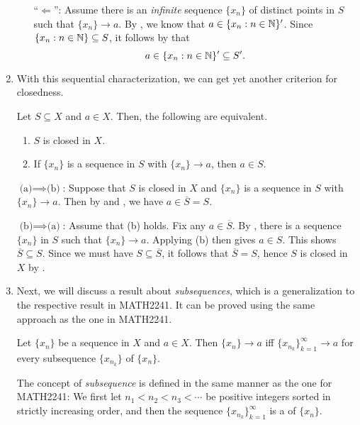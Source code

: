 \begin{enumerate}
\begin{pf}
\begin{enumerate}
``\(\Leftarrow\)'': Assume there is an \emph{infinite} sequence \(\{x_n\}\) of
distinct points in \(S\) such that \(\{x_n\}\to a\). By
, we know that \(a\in\{x_n:n\in\mathbb{N}\}'\). Since
\(\{x_n:n\in\mathbb{N}\}\subseteq S\), it follows by 
that
\[
a\in\{x_n:n\in\mathbb{N}\}'\subseteq S'.
\]
\end{enumerate}
\end{pf}
\item With this sequential characterization, we can get yet another criterion
for closedness.

\begin{proposition}
\label{prp:closed-seq-crit}
Let \(S\subseteq X\) and \(a\in X\). Then, the following are equivalent.
\begin{enumerate}
\item \(S\) is closed in \(X\).
\item If \(\{x_n\}\) is a sequence in \(S\) with \(\{x_n\}\to a\), then \(a\in
S\).
\end{enumerate}
\end{proposition}
\begin{pf}
\underline{\(\text{(a)}\implies \text{(b)}\)}: Suppose that \(S\) is closed in \(X\) and
\(\{x_n\}\) is a sequence in \(S\) with \(\{x_n\}\to a\). Then by
 and , we have
\(a\in \overline{S}=S\).

\underline{\(\text{(b)}\implies \text{(a)}\)}: Assume that (b) holds. Fix any
\(a\in\overline{S}\). By , there is a sequence
\(\{x_n\}\) in \(S\) such that \(\{x_n\}\to a\). Applying (b) then gives \(a\in
S\). This shows \(\overline{S}\subseteq S\). Since we must have \(S\subseteq
\overline{S}\), it follows that \(\overline{S}=S\), hence \(S\) is closed in
\(X\) by .
\end{pf}
\item Next, we will discuss a result about \emph{subsequences}, which is
a generalization to the respective result in MATH2241. It can be proved using
the same approach as the one in MATH2241.
\begin{proposition}
\label{prp:subseq-same-lim}
Let \(\{x_n\}\) be a sequence in \(X\) and \(a\in X\). Then \(\{x_n\}\to a\)
iff \(\{x_{n_k}\}_{k=1}^{\infty}\to a\) for every subsequence \(\{x_{n_k}\}\)
of \(\{x_n\}\).
\end{proposition}
\begin{note}
The concept of \emph{subsequence} is defined in the same manner as the one for
MATH2241: We first let \(n_1<n_2<n_3<\dotsb\) be positive integers sorted in
strictly increasing order, and then the sequence \(\{x_{n_k}\}_{k=1}^{\infty}\)
is a  of \(\{x_n\}\).
\end{note}


\end{enumerate}
